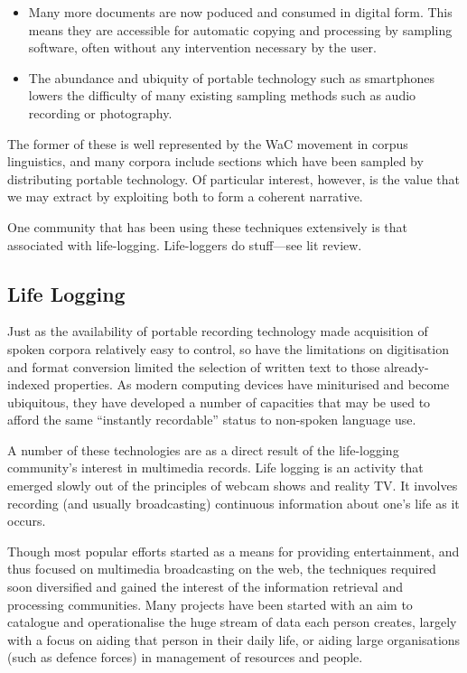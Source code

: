 \begin{itemize}
    \item Many more documents are now poduced and consumed in digital form.  This means they are accessible for automatic copying and processing by sampling software, often without any intervention necessary by the user.
    \item The abundance and ubiquity of portable technology such as smartphones lowers the difficulty of many existing sampling methods such as audio recording or photography.
\end{itemize}


The former of these is well represented by the WaC movement in corpus linguistics, and many corpora include sections which have been sampled by distributing portable technology.  Of particular interest, however, is the value that we may extract by exploiting both to form a coherent narrative.

One community that has been using these techniques extensively is that associated with life-logging.  Life-loggers do stuff---see lit review.










\subsection{Life Logging}
Just as the availability of portable recording technology made acquisition of spoken corpora relatively easy to control, so have the limitations on digitisation and format conversion limited the selection of written text to those already-indexed properties.  As modern computing devices have miniturised and become ubiquitous, they have developed a number of capacities that may be used to afford the same ``instantly recordable'' status to non-spoken language use.


A number of these technologies are as a direct result of the life-logging community's interest in multimedia records.  Life logging is an activity that emerged slowly out of the principles of webcam shows and reality TV.  It involves recording (and usually broadcasting) continuous information about one's life as it occurs.

Though most popular efforts started as a means for providing entertainment, and thus focused on multimedia broadcasting on the web, the techniques required soon diversified and gained the interest of the information retrieval and processing communities.  Many projects have been started with an aim to catalogue and operationalise the huge stream of data each person creates, largely with a focus on aiding that person in their daily life, or aiding large organisations (such as defence forces) in management of resources and people.

